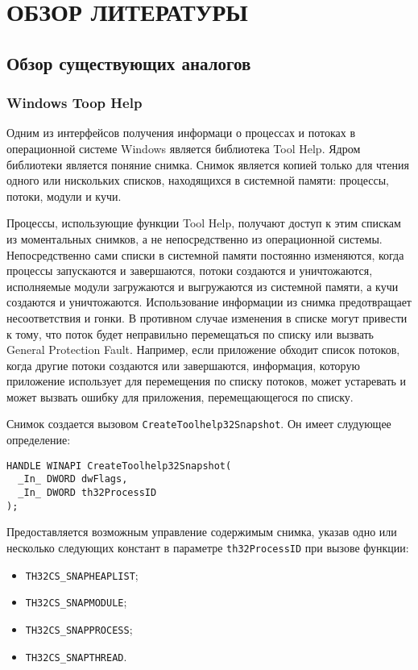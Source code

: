 \section{ОБЗОР ЛИТЕРАТУРЫ}
\label{sec:domain}

\subsection{Обзор существующих аналогов}
\label{sub:domain:analogs}

\subsubsection{Windows Toop Help}
\label{sub:domain:analogs:windows}

Одним из интерфейсов получения информаци о процессах и потоках в операционной
системе Windows является библиотека Tool Help\cite{tool_help_article}. Ядром
библиотеки является поняние снимка. Снимок является копией только для чтения
одного или нискольких списков, находящихся в системной памяти:
процессы, потоки, модули и кучи.

Процессы, использующие функции Tool Help, получают доступ к этим спискам из
моментальных снимков, а не непосредственно из операционной системы.
Непосредственно сами списки в системной памяти постоянно изменяются, когда
процессы запускаются и завершаются, потоки создаются и уничтожаются, исполняемые
модули загружаются и выгружаются из системной памяти, а кучи создаются и
уничтожаются. Использование информации из снимка предотвращает несоответствия и
гонки. В противном случае изменения в списке могут привести к тому, что поток
будет неправильно перемещаться по списку или вызвать General Protection Fault.
Например, если приложение обходит список потоков, когда другие потоки создаются
или завершаются, информация, которую приложение использует для перемещения по
списку потоков, может устаревать и может вызвать ошибку для приложения,
перемещающегося по списку.

Снимок создается вызовом \texttt{CreateToolhelp32Snapshot}. Он имеет слудующее
определение\cite{win_tool_help}:

\medskip
\begin{lstlisting}[style=cstyle]
HANDLE WINAPI CreateToolhelp32Snapshot(
  _In_ DWORD dwFlags,
  _In_ DWORD th32ProcessID
);
\end{lstlisting}
\medskip

Предоставляется возможным управление содержимым снимка, указав одно или
несколько следующих констант в параметре \texttt{th32ProcessID} при вызове
функции:
\begin{itemize}
\item \texttt{TH32CS\_SNAPHEAPLIST};
\item \texttt{TH32CS\_SNAPMODULE};
\item \texttt{TH32CS\_SNAPPROCESS};
\item \texttt{TH32CS\_SNAPTHREAD}.
\end{itemize}

